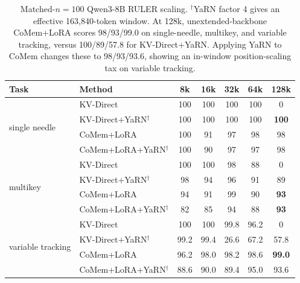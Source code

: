 \begin{table}[!t]
\centering
\small
\setlength{\tabcolsep}{3.8pt}
\begin{tabular}{@{}llccccc@{}}
\toprule
\textbf{Task} & \textbf{Method} & \textbf{8k} & \textbf{16k} & \textbf{32k} & \textbf{64k} & \textbf{128k} \\
\midrule
\multirow{4}{*}{single needle}
& KV-Direct & 100 & 100 & 100 & 100 & 0 \\
& KV-Direct+YaRN$^\dagger$ & 100 & 100 & 100 & 100 & \textbf{100} \\
& CoMem+LoRA & 100 & 91 & 97 & 98 & 98 \\
& CoMem+LoRA+YaRN$^\dagger$ & 100 & 90 & 97 & 97 & 98 \\
\midrule
\multirow{4}{*}{multikey}
& KV-Direct & 100 & 100 & 98 & 88 & 0 \\
& KV-Direct+YaRN$^\dagger$ & 98 & 94 & 96 & 91 & 89 \\
& CoMem+LoRA & 94 & 91 & 99 & 90 & \textbf{93} \\
& CoMem+LoRA+YaRN$^\dagger$ & 82 & 85 & 94 & 88 & \textbf{93} \\
\midrule
\multirow{4}{*}{variable tracking}
& KV-Direct & 100 & 100 & 99.8 & 96.2 & 0 \\
& KV-Direct+YaRN$^\dagger$ & 99.2 & 99.4 & 26.6 & 67.2 & 57.8 \\
& CoMem+LoRA & 96.2 & 98.0 & 98.2 & 98.6 & \textbf{99.0} \\
& CoMem+LoRA+YaRN$^\dagger$ & 88.6 & 90.0 & 89.4 & 95.0 & 93.6 \\
\bottomrule
\end{tabular}
\caption{Matched-$n{=}100$ Qwen3-8B RULER scaling. $^\dagger$YaRN factor 4
gives an effective 163,840-token window. At 128k, unextended-backbone CoMem+LoRA scores
98/93/99.0 on single-needle, multikey, and variable tracking, versus
100/89/57.8 for KV-Direct+YaRN. Applying YaRN to CoMem changes these to
98/93/93.6, showing an in-window position-scaling tax on variable tracking.}
\label{tab:scaling}
\end{table}
